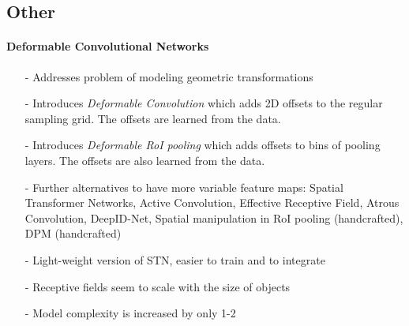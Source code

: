 	\subsection{Other}
	\paragraph{Deformable Convolutional Networks \cite{Dai}}
	\begin{itemize}
		\item[-] Addresses problem of modeling geometric transformations
		\item[-] Introduces \textit{Deformable Convolution} which adds 2D offsets to the regular sampling grid. The offsets are learned from the data.
		\item[-] Introduces \textit{Deformable RoI pooling} which adds offsets to bins of pooling layers. The offsets are also learned from the data.
		\item[-] Further alternatives to have more variable feature maps: Spatial Transformer Networks, Active Convolution, Effective Receptive Field, Atrous Convolution, DeepID-Net, Spatial manipulation in RoI pooling (handcrafted), DPM (handcrafted)
		\item[-] Light-weight version of STN, easier to train and to integrate
		\item[-] Receptive fields seem to scale with the size of objects
		\item[-] Model complexity is increased by only 1-2%
	\end{itemize}
	
